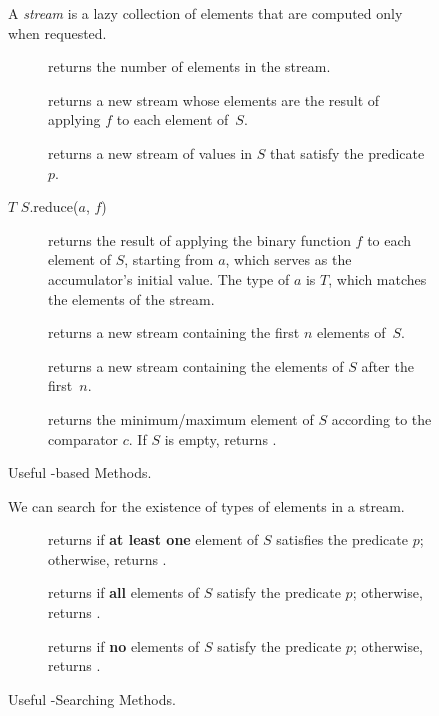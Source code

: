 \begin{figure}[tp]
  \small
  \begin{tcolorbox}[title=Java Streams]
    A \textit{stream} is a lazy collection of elements that are computed only when requested.
    \vspace{2ex}
  \begin{description}
    \item [] returns the number of elements in the stream.
    \item [] returns a new stream whose elements are the result of applying $f$ to each element of~$S$.
    \item [] returns a new stream of values in $S$ that satisfy the predicate~$p$.
    \item [$T$ $S$.reduce($a$, $f$)] returns the result of applying the binary function $f$ to each element of $S$, starting from $a$, which serves as the accumulator's initial value. The type of $a$ is $T$, which matches the elements of the stream.
    \item [] returns a new stream containing the first $n$ elements of~$S$.
    \item [] returns a new stream containing the elements of $S$ after the first~$n$.
    \item [] returns the minimum/maximum element of $S$ according to the comparator $c$. If $S$ is empty, returns .
  \end{description}
\end{tcolorbox}
  \caption{Useful -based Methods.}
  \label{fig:streams}
\end{figure}

\begin{figure}[tp]
  \small
  \begin{tcolorbox}[title=Java Stream--Searching Methods]
    We can search for the existence of types of elements in a stream.
    \vspace{2ex}
  \begin{description}
    \item [] returns  if \textbf{at least one} element of $S$ satisfies the predicate $p$; otherwise, returns .
    \item [] returns  if \textbf{all} elements of $S$ satisfy the predicate $p$; otherwise, returns .
    \item [] returns  if \textbf{no} elements of $S$ satisfy the predicate $p$; otherwise, returns .
  \end{description}
\end{tcolorbox}
  \caption{Useful -Searching Methods.}
  \label{fig:streams-searching}
\end{figure}

